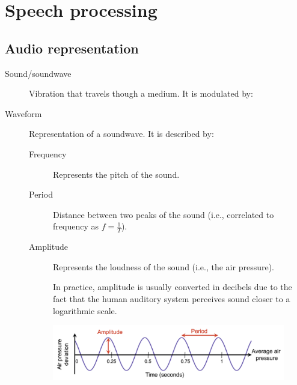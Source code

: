\chapter{Speech processing}


\section{Audio representation}

\begin{description}
    \item[Sound/soundwave] 
        Vibration that travels though a medium. It is modulated by:

    \item[Waveform] 
        Representation of a soundwave. It is described by:
        \begin{description}
            \item[Frequency] 
                Represents the pitch of the sound.

            \item[Period] 
                Distance between two peaks of the sound (i.e., correlated to frequency as $f=\frac{1}{T}$).

            \item[Amplitude] 
                Represents the loudness of the sound (i.e., the air pressure).

                \begin{remark}
                    In practice, amplitude is usually converted in decibels due to the fact that the human auditory system perceives sound closer to a logarithmic scale.
                \end{remark}
        \end{description}

        \begin{figure}[H]
            \centering
            \includegraphics[width=0.7\linewidth]{./img/waveform.png}
        \end{figure}


\end{description}
